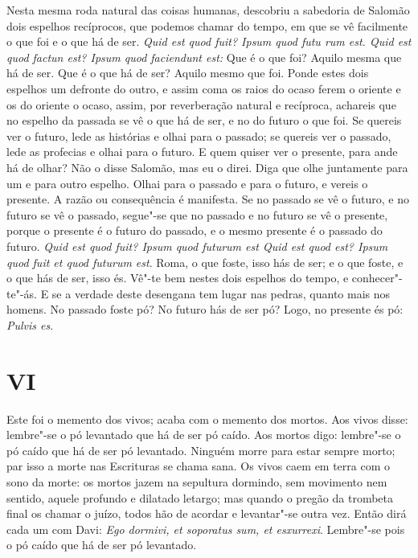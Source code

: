 Nesta mesma roda natural das coisas humanas, descobriu a sabedoria de
Salomão dois espelhos recíprocos, que podemos chamar do tempo, em que se
vê facilmente o que foi e o que há de ser. \emph{Quid est quod fuit?
Ipsum quod futu rum est. Quid est quod factun est? Ipsum quod faciendunt
est:} Que é o que foi? Aquilo mesma que há de ser. Que é o que há de
ser? Aquilo mesmo que foi. Ponde estes dois espelhos um %
defronte do outro, e assim coma os raios do ocaso ferem o oriente e os
do oriente o ocaso, assim, por reverberação natural e recíproca,
achareis que no espelho da passada se vê o que há de ser, e no do futuro
o que foi. Se quereis ver o futuro, lede as histórias e olhai para o
passado; se quereis ver o passado, lede as profecias e olhai para o
futuro. E quem quiser ver o presente, para ande há de olhar? Não o disse Salomão, mas eu o direi. Diga que olhe juntamente para um e para outro espelho. Olhai para
o passado e para o futuro, e vereis o presente. A razão ou consequência
é manifesta. Se no passado se vê o futuro, e no futuro se vê o passado,
segue"-se que no passado e no futuro se vê o presente, porque o presente
é o futuro do passado, e o mesmo presente é o passado do futuro.
\emph{Quid est quod fuit? Ipsum quod futurum est Quid est quod est?
Ipsum quod fuit et quod futurum est}. Roma, o que foste, isso hás de
ser; e o que foste, e o que hás de ser, isso és. Vê"-te bem nestes dois
espelhos do tempo, e conhecer"-te"-ás. E se a verdade deste desengana tem
lugar nas pedras, quanto mais nos homens. No passado foste pó? No futuro
hás de ser pó? Logo, no presente és pó: \emph{Pulvis es}.

\section*{VI}

Este foi o memento dos vivos; acaba com o memento dos mortos. Aos vivos
disse: lembre"-se o pó levantado que há de ser pó caído. Aos mortos digo:
lembre"-se o pó caído que há de ser pó levantado. Ninguém morre para
estar sempre morto; par isso a morte nas Escrituras se chama sana. Os
vivos caem em terra com o sono da morte: os mortos jazem na sepultura
dormindo, sem movimento nem sentido, aquele profundo e dilatado letargo;
mas quando o pregão da trombeta final os chamar o juízo, todos hão de
acordar e levantar"-se outra vez. Então dirá cada um com Davi: \emph{Ego
dormivi, et soporatus sum, et esxurrexi}. Lembre"-se pois o pó caído
que há de ser pó levantado.

